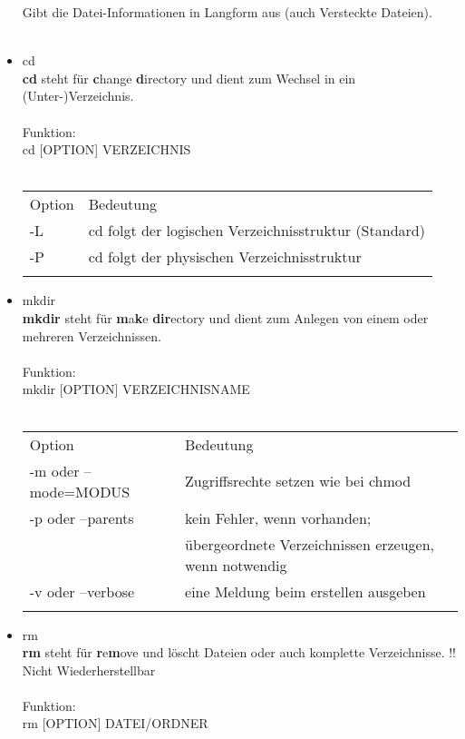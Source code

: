 \begin{itemize}
			Gibt die Datei-Informationen in Langform aus (auch Versteckte Dateien).\\ \\
			\newpage
			\item cd\\
			\textbf{cd} steht f\"ur \textbf{c}hange \textbf{d}irectory und dient zum Wechsel in ein (Unter-)Verzeichnis.\\ \\
			Funktion:\\
			cd [OPTION] VERZEICHNIS\\ \\
			\begin{tabular}{ll}
				Option & Bedeutung \\
				-L & cd folgt der logischen Verzeichnisstruktur (Standard)\\
				-P & cd folgt der physischen Verzeichnisstruktur\\ \\
			\end{tabular}
			\item mkdir\\
			\textbf{mkdir} steht f\"ur \textbf{m}a\textbf{k}e \textbf{dir}ectory und dient zum Anlegen von einem oder mehreren Verzeichnissen.\\  \\
			Funktion:\\
			mkdir [OPTION] VERZEICHNISNAME\\ \\
			\begin{tabular}{ll}
				Option & Bedeutung \\
				-m oder --mode=MODUS & Zugriffsrechte setzen wie bei chmod\\
				-p oder --parents & kein Fehler, wenn vorhanden;\\
				 & übergeordnete Verzeichnissen erzeugen, wenn notwendig\\
				-v oder --verbose & eine Meldung beim erstellen ausgeben\\ \\
			\end{tabular}
			\item rm\\
			\textbf{rm} steht f\"ur \textbf{r}e\textbf{m}ove und l\"oscht Dateien oder auch komplette Verzeichnisse. !! Nicht Wiederherstellbar\\ \\
			Funktion:\\
			rm [OPTION] DATEI/ORDNER\\ \\

\end{itemize}
